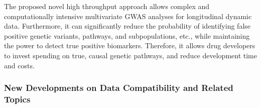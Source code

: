 \begin{itemize}
The proposed novel high throughput approach allows complex and computationally intensive multivariate GWAS analyses for longitudinal dynamic data. Furthermore, it can significantly reduce the probability of identifying false positive genetic variants, pathways, and subpopulations, etc., while maintaining the power to detect true positive biomarkers. Therefore, it allows drug developers to invest spending on true, causal genetic pathways, and reduce development time and costs.

\end{itemize}

\subsubsection*{New Developments on Data Compatibility and Related  Topics}


